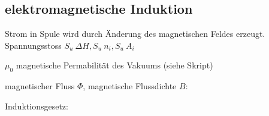 \subsection*{elektromagnetische Induktion}
    Strom in Spule wird durch Änderung des magnetischen Feldes erzeugt.
    Spannungsstoss
    $ S_u ~ \Delta H, S_u ~ n_i, S_u ~ A_i$
    
    $\mu_0$ magnetische Permabilität des Vakuums (siehe Skript)

    magnetischer Fluss $\Phi$, magnetische Flussdichte $B$:

    Induktionsgesetz:
